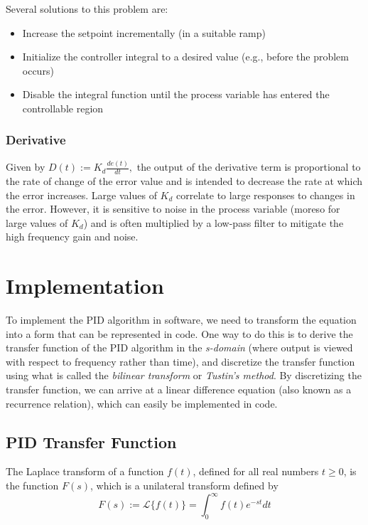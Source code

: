 \documentclass[11pt]{article}
\theoremstyle{definition}
\begin{document}
Several solutions to this problem are:

\begin{itemize}
    \item Increase the setpoint incrementally (in a suitable ramp)
    \item Initialize the controller integral to a desired value (e.g., before the problem occurs)
    \item Disable the integral function until the process variable has entered the controllable region
\end{itemize}

\subsubsection{Derivative}

Given by $D(t) := K_{d}\frac{de(t)}{dt},$ the output of the derivative term is proportional to the rate of change of the error value
and is intended to decrease the rate at which the error increases. Large values of $K_{d}$ correlate to large responses to changes in the
error. However, it is sensitive to noise in the process variable (moreso for large values of $K_{d}$) and is often multiplied by a low-pass
filter to mitigate the high frequency gain and noise.

\section{Implementation}

To implement the PID algorithm in software, we need to transform the equation into a form that can be represented in code. One way to do
this is to derive the transfer function of the PID algorithm in the \textit{s-domain} (where output is viewed with respect to frequency
rather than time), and discretize the transfer function using what is called the \textit{bilinear transform} or \textit{Tustin's method}.
By discretizing the transfer function, we can arrive at a linear difference equation (also known as a recurrence relation), which
can easily be implemented in code.

\subsection{PID Transfer Function}

The Laplace transform of a function $f(t)$, defined for all real numbers $t \geq 0$, is the function $F(s)$, which is a unilateral transform defined by 
\begin{equation} \label{eq2}
    \boxed{
        F(s) := \mathcal{L}\{f(t)\} = \int_{0}^{\infty}f(t)e^{-st}dt
    }
\end{equation}
\end{document}
